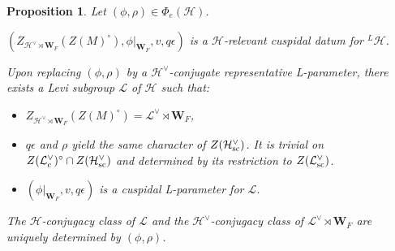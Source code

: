 \documentclass[11pt]{amsart}
\newtheorem{prop}[thm]{Proposition}
\theoremstyle{definition}
\newcommand{\enuma}[1]{\begin{enumerate}[\textup{(}a\textup{)}] {#1} \end{enumerate}}
\newcommand{\mb}{\mathbf}
\def\cL{{\mathcal L}}
\def\cH{{\mathcal H}}
\def\sc{{\rm sc}}
\begin{document}
\begin{prop}\label{prop:7.2}
Let $(\phi,\rho) \in \Phi_e (\cH)$.
\enuma{
\item $(Z_{\cH^\vee \rtimes \mb W_F}(Z(M)^\circ),\phi |_{\mb W_F},v,q \epsilon)$
is a $\cH$-relevant cuspidal datum for ${}^L \cH$.
\item Upon replacing $(\phi,\rho)$ by a $\cH^\vee$-conjugate representative
L-parameter, there exists a Levi subgroup $\cL$ of $\cH$ such that:
\begin{itemize} 
\item $Z_{\cH^\vee \rtimes \mb W_F}(Z(M)^\circ) = \cL^\vee \rtimes \mb W_F$,
\item $q \epsilon$ and $\rho$ yield the same character of $Z(\cH^\vee_\sc)$.
It is trivial on \\ $Z(\cL^\vee_c)^\circ \cap Z(\cH^\vee_\sc)$
and determined by its restriction to $Z(\cL^\vee_\sc)$.
\item $(\phi |_{\mb W_F},v,q \epsilon)$ is a cuspidal L-parameter for $\cL$. 
\end{itemize}
\item The $\cH$-conjugacy class of $\cL$ and the $\cH^\vee$-conjugacy
class of $\cL^\vee \rtimes \mb W_F$ are uniquely determined by $(\phi,\rho)$.
}
\end{prop}
\end{document}
